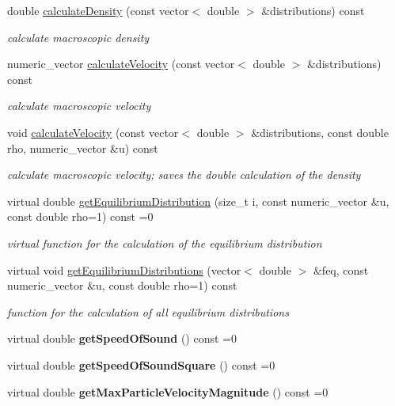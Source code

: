 \begin{DoxyCompactItemize}
\item 
double \hyperlink{classnatrium_1_1BoltzmannModel_a9a96d883c99aa768d4153ea9a081776d}{calculate\-Density} (const vector$<$ double $>$ \&distributions) const 
\begin{DoxyCompactList}\small\item\em calculate macroscopic density \end{DoxyCompactList}\item 
numeric\-\_\-vector \hyperlink{classnatrium_1_1BoltzmannModel_acf451284cbf459e6d6d143adb53901cf}{calculate\-Velocity} (const vector$<$ double $>$ \&distributions) const 
\begin{DoxyCompactList}\small\item\em calculate macroscopic velocity \end{DoxyCompactList}\item 
void \hyperlink{classnatrium_1_1BoltzmannModel_ab2f5a72bd9eb54d0e134b94f109fa6b1}{calculate\-Velocity} (const vector$<$ double $>$ \&distributions, const double rho, numeric\-\_\-vector \&u) const 
\begin{DoxyCompactList}\small\item\em calculate macroscopic velocity; saves the double calculation of the density \end{DoxyCompactList}\item 
virtual double \hyperlink{classnatrium_1_1BoltzmannModel_ad482e26c4df3014e4b1447ee6cbb44ff}{get\-Equilibrium\-Distribution} (size\-\_\-t i, const numeric\-\_\-vector \&u, const double rho=1) const =0
\begin{DoxyCompactList}\small\item\em virtual function for the calculation of the equilibrium distribution \end{DoxyCompactList}\item 
virtual void \hyperlink{classnatrium_1_1BoltzmannModel_a3ca36ff192abe3b3fe07529d55e5be29}{get\-Equilibrium\-Distributions} (vector$<$ double $>$ \&feq, const numeric\-\_\-vector \&u, const double rho=1) const 
\begin{DoxyCompactList}\small\item\em function for the calculation of all equilibrium distributions \end{DoxyCompactList}\item 
\hypertarget{classnatrium_1_1BoltzmannModel_a309322c01514409cb2c29df1c287cb81}{virtual double {\bfseries get\-Speed\-Of\-Sound} () const =0}\label{classnatrium_1_1BoltzmannModel_a309322c01514409cb2c29df1c287cb81}

\item 
\hypertarget{classnatrium_1_1BoltzmannModel_a6ac22a5fa289299664271b6d0f86235a}{virtual double {\bfseries get\-Speed\-Of\-Sound\-Square} () const =0}\label{classnatrium_1_1BoltzmannModel_a6ac22a5fa289299664271b6d0f86235a}

\item 
\hypertarget{classnatrium_1_1BoltzmannModel_a6230558a6d44b83460d18f680626758f}{virtual double {\bfseries get\-Max\-Particle\-Velocity\-Magnitude} () const =0}\label{classnatrium_1_1BoltzmannModel_a6230558a6d44b83460d18f680626758f}

\end{DoxyCompactItemize}


